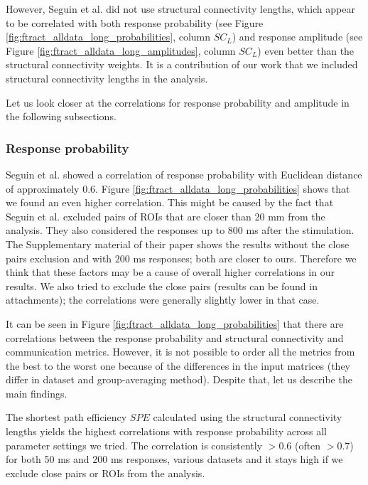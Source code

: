 However, Seguin et al. did not use structural connectivity lengths, which appear to be correlated with both response probability (see Figure \ref{fig:ftract_alldata_long_probabilities}, column $SC_L$) and response amplitude (see Figure \ref{fig:ftract_alldata_long_amplitudes}, column $SC_L$) even better than the structural connectivity weights. It is a contribution of our work that we included structural connectivity lengths in the analysis. 

Let us look closer at the correlations for response probability and amplitude in the following subsections.

\subsubsection{Response probability}\label{sec:probability_F-Tract}

Seguin et al. showed a correlation of response probability with Euclidean distance of approximately $0.6$. Figure \ref{fig:ftract_alldata_long_probabilities} shows that we found an even higher correlation. This might be caused by the fact that Seguin et al. excluded pairs of ROIs that are closer than 20 mm from the analysis. They also considered the responses up to 800 ms after the stimulation. The Supplementary material of their paper shows the results without the close pairs exclusion and with 200 ms responses; both are closer to ours. Therefore we think that these factors may be a cause of overall higher correlations in our results. We also tried to exclude the close pairs (results can be found in attachments); the correlations were generally slightly lower in that case. 

It can be seen in Figure \ref{fig:ftract_alldata_long_probabilities} that there are correlations between the response probability and structural connectivity and communication metrics. However, it is not possible to order all the metrics from the best to the worst one because of the differences in the input matrices (they differ in dataset and group-averaging method). Despite that, let us describe the main findings.

The shortest path efficiency $SPE$ calculated using the structural connectivity lengths yields the highest correlations with response probability across all parameter settings we tried. The correlation is consistently $>0.6$ (often $>0.7$) for both 50 ms and 200 ms responses, various datasets and it stays high if we exclude close pairs or ROIs from the analysis.

